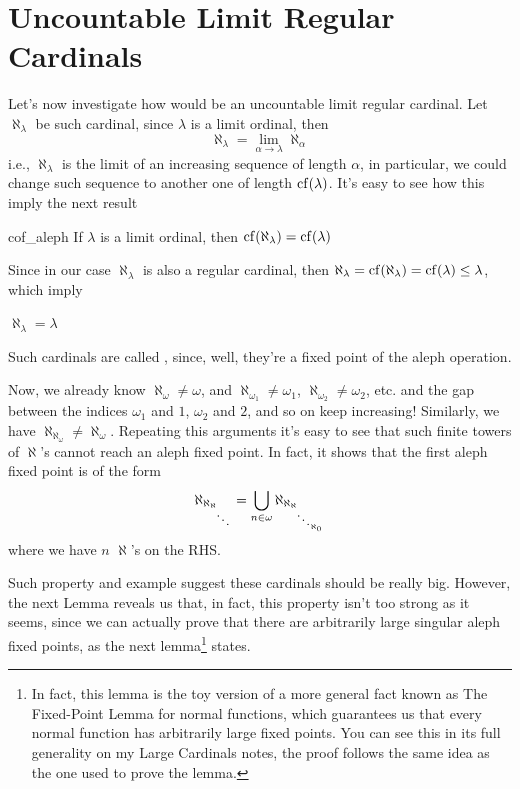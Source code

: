 \section{Uncountable Limit Regular Cardinals}\label{sec:weakly_inaccessible}

Let's now investigate how would be an uncountable limit regular cardinal. Let $\aleph_\lambda$ be such cardinal, since $\lambda$ is a limit ordinal, then
$$\aleph_\lambda=\lim_{\alpha\to\lambda}\aleph_\alpha$$
i.e., $\aleph_\lambda$ is the limit of an increasing sequence of length $\alpha$, in particular, we could change such sequence to another one of length $\mathrm{cf}\!\left(\lambda\right)$. It's easy to see how this imply the next result
\begin{lemma}{}{cof_aleph}
    If $\lambda$ is a limit ordinal, then $\mathrm{cf}\!\left(\aleph_\lambda\right)=\mathrm{cf}\!\left(\lambda\right)$
\end{lemma}

Since in our case $\aleph_\lambda$ is also a regular cardinal, then $\aleph_\lambda=\mathrm{cf}\!\left(\aleph_\lambda\right)=\mathrm{cf}\!\left(\lambda\right)\leq\lambda$, which imply
\begin{center}
    \begin{tcolorbox}[hbox]
    $\aleph_\lambda=\lambda$
    \end{tcolorbox}
\end{center}
Such cardinals are called , since, well, they're a fixed point of the aleph operation.

Now, we already know $\aleph_\omega\neq\omega$, and $\aleph_{\omega_1}\neq\omega_1$, $\aleph_{\omega_2}\neq\omega_2$, etc. and the gap between the indices $\omega_1$ and $1$, $\omega_2$ and $2$, and so on keep increasing! Similarly, we have $\aleph_{\aleph_\omega}\neq\aleph_\omega$. Repeating this arguments it's easy to see that such finite towers of $\aleph$'s cannot reach an aleph fixed point. In fact, it shows that the first aleph fixed point is of the form
$$\aleph_{\aleph_{\aleph_{\small\ddots}}}=\bigcup_{n\in\omega}\aleph_{\aleph_{\aleph_{\small\ddots_{\aleph_0}}}}$$
where we have $n$ $\aleph$'s on the RHS.

Such property and example suggest these cardinals should be really big. However, the next Lemma reveals us that, in fact, this property isn't too strong as it seems, since we can actually prove that there are arbitrarily large singular aleph fixed points, as the next lemma\footnote{In fact, this lemma is the toy version of a more general fact known as The Fixed-Point Lemma for normal functions, which guarantees us that every normal function has arbitrarily large fixed points. You can see this in its full generality on my Large Cardinals notes, the proof follows the same idea as the one used to prove the lemma.} states.

